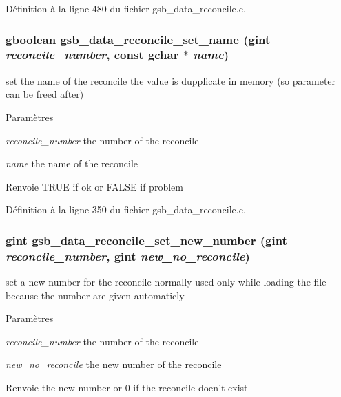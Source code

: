 Définition à la ligne 480 du fichier gsb\_\-data\_\-reconcile.c.

\subsubsection[{gsb\_\-data\_\-reconcile\_\-set\_\-name}]{\setlength{\rightskip}{0pt plus 5cm}gboolean gsb\_\-data\_\-reconcile\_\-set\_\-name (gint {\em reconcile\_\-number}, \/  const gchar $\ast$ {\em name})}\label{gsb__data__reconcile_8c_ad4723e032886e6a97aa32b39363463f1}
set the name of the reconcile the value is dupplicate in memory (so parameter can be freed after)


\begin{DoxyParams}{Paramètres}
\item[{\em reconcile\_\-number}]the number of the reconcile \item[{\em name}]the name of the reconcile\end{DoxyParams}
\begin{DoxyReturn}{Renvoie}
TRUE if ok or FALSE if problem 
\end{DoxyReturn}


Définition à la ligne 350 du fichier gsb\_\-data\_\-reconcile.c.

\subsubsection[{gsb\_\-data\_\-reconcile\_\-set\_\-new\_\-number}]{\setlength{\rightskip}{0pt plus 5cm}gint gsb\_\-data\_\-reconcile\_\-set\_\-new\_\-number (gint {\em reconcile\_\-number}, \/  gint {\em new\_\-no\_\-reconcile})}\label{gsb__data__reconcile_8c_aa86c8172d748f9c6d545e0062818578d}
set a new number for the reconcile normally used only while loading the file because the number are given automaticly


\begin{DoxyParams}{Paramètres}
\item[{\em reconcile\_\-number}]the number of the reconcile \item[{\em new\_\-no\_\-reconcile}]the new number of the reconcile\end{DoxyParams}
\begin{DoxyReturn}{Renvoie}
the new number or 0 if the reconcile doen't exist 
\end{DoxyReturn}


